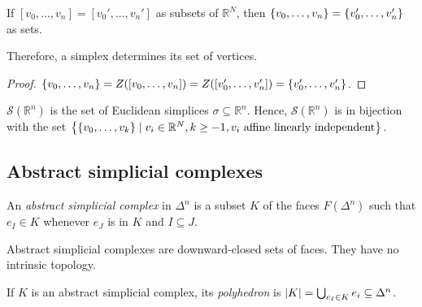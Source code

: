 \begin{corollary}
	If \( [v_0, \dots, v_n] = [v_0', \dots, v_n'] \) as subsets of \( \mathbb R^N \), then \( \qty{v_0, \dots, v_n} = \qty{v_0', \dots, v_n'} \) as sets.
\end{corollary}
Therefore, a simplex determines its set of vertices.
\begin{proof}
	\( \qty{v_0, \dots, v_n} = Z([v_0, \dots, v_n]) = Z([v_0', \dots, v_n']) = \qty{v_0', \dots, v_n'} \).
\end{proof}
\begin{definition}
	\( \mathcal S(\mathbb R^n) \) is the set of Euclidean simplices \( \sigma \subseteq \mathbb R^n \).
	Hence, \( \mathcal S(\mathbb R^n) \) is in bijection with the set \( \qty{\qty{v_0, \dots, v_k} \mid v_i \in \mathbb R^N, k \geq -1, v_i \text{ affine linearly independent}} \).
\end{definition}

\subsection{Abstract simplicial complexes}
\begin{definition}
	An \emph{abstract simplicial complex} in \( \Delta^n \) is a subset \( K \) of the faces \( F(\Delta^n) \) such that \( e_I \in K \) whenever \( e_J \) is in \( K \) and \( I \subseteq J \).
\end{definition}
\begin{remark}
	Abstract simplicial complexes are downward-closed sets of faces.
	They have no intrinsic topology.
\end{remark}
\begin{definition}
	If \( K \) is an abstract simplicial complex, its \emph{polyhedron} is \( \abs{K} = \bigcup_{e_I \in K} e_i \subseteq \Delta^n \).
\end{definition}
